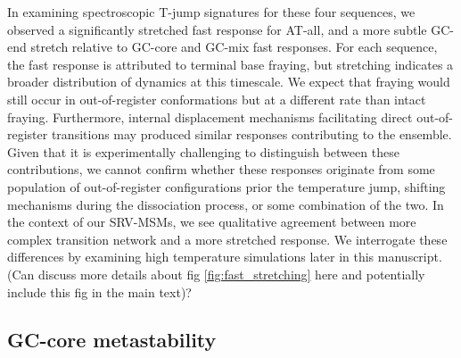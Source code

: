 \documentclass[journal=jpcbfk,manuscript=article]{achemso}
\begin{document}
In examining spectroscopic T-jump signatures for these four sequences, we observed a significantly stretched fast response for AT-all, and a more subtle GC-end stretch relative to GC-core and GC-mix fast responses. For each sequence, the fast response is attributed to terminal base fraying, but stretching indicates a broader distribution of dynamics at this timescale. We expect that fraying would still occur in out-of-register conformations but at a different rate than intact fraying. Furthermore, internal displacement mechanisms facilitating direct out-of-register transitions may produced similar responses contributing to the ensemble. Given that it is experimentally challenging to distinguish between these contributions, we cannot confirm whether these responses originate from some population of out-of-register configurations prior the temperature jump, shifting mechanisms during the dissociation process, or some combination of the two. In the context of our SRV-MSMs, we see qualitative agreement between more complex transition network and a more stretched response. We interrogate these differences by examining high temperature simulations later in this manuscript. (Can discuss more details about fig \ref{fig:fast_stretching} here and potentially include this fig in the main text)?



\subsection{GC-core metastability} %
\end{document}
